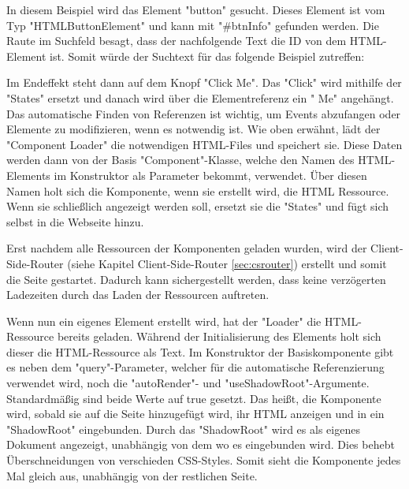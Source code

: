 In diesem Beispiel wird das Element "{\ttfamily button}" gesucht. Dieses Element ist vom Typ "{\ttfamily HTMLButtonElement}" und kann mit "{\ttfamily \#btnInfo}" gefunden werden. Die Raute im Suchfeld besagt, dass der nachfolgende Text die ID von dem HTML-Element ist. Somit würde der Suchtext für das folgende Beispiel zutreffen:


Im Endeffekt steht dann auf dem Knopf "Click Me". Das "Click" wird mithilfe der
"States" ersetzt und danach wird über die Elementreferenz ein " Me" angehängt. Das automatische Finden von Referenzen ist wichtig, um Events abzufangen oder Elemente zu modifizieren, wenn es notwendig ist.
Wie oben erwähnt, lädt der "Component Loader" die notwendigen HTML-Files und speichert sie. Diese Daten werden dann von der Basis "Component"-Klasse, welche den Namen des HTML-Elements im Konstruktor als Parameter bekommt, verwendet. Über diesen Namen holt sich die Komponente, wenn sie erstellt wird, die HTML Ressource. Wenn sie schließlich angezeigt werden soll, ersetzt sie die "States" und fügt sich selbst in die Webseite hinzu.


Erst nachdem alle Ressourcen der Komponenten geladen wurden, wird der Client-Side-Router (siehe Kapitel Client-Side-Router \ref{sec:csrouter}) erstellt und somit die Seite gestartet. Dadurch kann sichergestellt werden, dass keine verzögerten Ladezeiten durch das Laden der Ressourcen auftreten.

\begin{minipage}{\textwidth}
    
    Wenn nun ein eigenes Element erstellt wird, hat der "Loader" die HTML-Ressource bereits geladen. Während der Initialisierung des Elements holt sich dieser die HTML-Ressource als Text. Im Konstruktor der Basiskomponente gibt es neben dem "query"-Parameter, welcher für die automatische Referenzierung verwendet wird, noch die "autoRender"- und "useShadowRoot"-Argumente. Standardmäßig sind beide Werte auf {\ttfamily true} gesetzt. Das heißt, die Komponente wird, sobald sie auf die Seite hinzugefügt wird, ihr HTML anzeigen und in ein "ShadowRoot" eingebunden. Durch das "ShadowRoot" wird es als eigenes Dokument angezeigt, unabhängig von dem wo es eingebunden wird. Dies behebt Überschneidungen von verschieden CSS-Styles. Somit sieht die Komponente jedes Mal gleich aus, unabhängig von der restlichen Seite.
\end{minipage}

